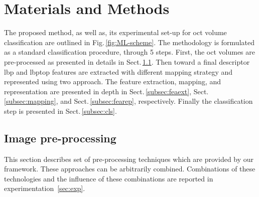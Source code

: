 \graphicspath{ {./content/method/figures/}}

\section{Materials and Methods}\label{sec:method}

The proposed method, as well as, its experimental set-up for \ac{oct} volume classification are outlined in Fig.\,\ref{fig:ML-scheme}.
The methodology is formulated as a standard classification procedure, through 5 steps.
First, the \ac{oct} volumes are pre-processed as presented in details in Sect.\,\ref{subsec:prepro}.
Then toward a final descriptor \ac{lbp} and \ac{lbptop} features are extracted with different mapping strategy and represented using two approach.
The feature extraction, mapping, and representation are presented in depth in Sect.\,\ref{subsec:feaext}, Sect.\,\ref{subsec:mapping}, and Sect.\,\ref{subsec:fearep}, respectively.
Finally the classification step is presented in Sect.\,\ref{subsec:cls}.


\subsection{Image pre-processing}\label{subsec:prepro}

This section describes set of pre-processing techniques which are provided by our framework.
These approaches can be arbitrarily combined.
Combinations of these technologies and the influence of these combinations are reported in experimentation~\cref{sec:exp}.

